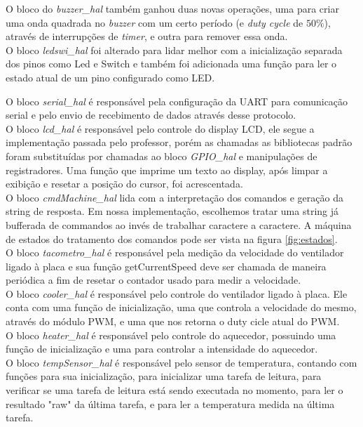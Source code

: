 \documentclass{article}
\begin{document}
O bloco do \textit{buzzer\_hal} também ganhou duas novas operações, uma para criar uma onda quadrada no \textit{buzzer} com um certo período (e \textit{duty cycle} de $50\%$), através de interrupções de \textit{timer}, e outra para remover essa onda.\\

O bloco \textit{ledswi\_hal} foi alterado para lidar melhor com a inicialização separada dos pinos como Led e Switch e também foi adicionada uma função para ler o estado atual de um pino configurado como LED.

O bloco \textit{serial\_hal} é responsável pela configuração da UART para comunicação serial e pelo envio de recebimento de dados através desse protocolo.\\

O bloco \textit{lcd\_hal} é responsável pelo controle do display LCD, ele segue a implementação passada pelo professor, porém as chamadas as bibliotecas padrão foram substituídas por chamadas ao bloco \textit{GPIO\_hal} e manipulações de registradores. Uma função que imprime um texto ao display, após limpar a exibição e resetar a posição do cursor, foi acrescentada.\\

O bloco \textit{cmdMachine\_hal} lida com a interpretação dos comandos e geração da string de resposta. Em nossa implementação, escolhemos tratar uma string já bufferada de commandos ao invés de trabalhar caractere a caractere. A máquina de estados do tratamento dos comandos pode ser vista na figura \ref{fig:estados}.\\

O bloco \textit{tacometro\_hal} é responsável pela medição da velocidade do ventilador ligado à placa e sua função getCurrentSpeed deve ser chamada de maneira periódica a fim de resetar o contador usado para medir a velocidade. \\

O bloco \textit{cooler\_hal} é responsável pelo controle do ventilador ligado à placa. Ele conta com uma função de inicialização, uma que controla a velocidade do mesmo, através do módulo PWM, e uma que nos retorna o duty cicle atual do PWM.\\

O bloco \textit{heater\_hal} é responsável pelo controle do aquecedor, possuindo uma função de inicialização e uma para controlar a intensidade do aquecedor.\\

O bloco \textit{tempSensor\_hal} é responsável pelo sensor de temperatura, contando com funções para sua inicialização, para inicializar uma tarefa de leitura, para verificar se uma tarefa de leitura está sendo executada no momento, para ler o resultado  "raw" da última tarefa, e para ler a temperatura medida na última tarefa.
\end{document}
